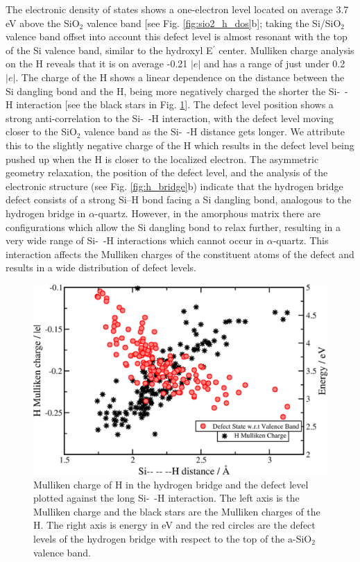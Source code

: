 \documentclass[aps,prb,reprint,superscriptaddress,showpacs]{revtex4-1}
\begin{document}
The electronic density of states shows a one-electron level located on average 3.7 eV above the SiO$_2$ valence band [see Fig. \ref{fig:sio2_h_dos}b]; taking the Si/SiO$_2$ valence band offset into account this defect level is almost resonant with the top of the Si valence band, similar to the hydroxyl E$^\prime$ center. Mulliken charge analysis on the H reveals that it is on average -0.21 $|e|$ and has a range of just under 0.2 $|e|$. The charge of the H shows a linear dependence on the distance between the Si dangling bond and the H, being more negatively charged the shorter the \mbox{Si- -H} interaction [see the black stars in Fig. \ref{fig:hbridge_correlation}]. The defect level position shows a strong anti-correlation to the \mbox{Si- -H} interaction, with the defect level moving closer to the SiO$_2$ valence band as the \mbox{Si- -H} distance gets longer. We attribute this to the slightly negative charge of the H which results in the defect level being pushed up when the H is closer to the localized electron. The asymmetric geometry relaxation, the position of the defect level, and the analysis of the electronic structure (see Fig. \ref{fig:h_bridge}b) indicate that the hydrogen bridge defect consists of a strong \mbox{Si--H} bond facing a Si dangling bond, analogous to the hydrogen bridge in $\alpha$-quartz. However, in the amorphous matrix there are configurations which allow the Si dangling bond to relax further, resulting in a very wide range of \mbox{Si- -H} interactions which cannot occur in $\alpha$-quartz. This interaction affects the Mulliken charges of the constituent atoms of the defect and results in a wide distribution of defect levels.

\begin{figure}[h!]
\includegraphics{hbridge_analysis.png}
\caption{Mulliken charge of H in the hydrogen bridge and the defect level plotted against the long \mbox{Si- -H} interaction. The left axis is the Mulliken charge and the black stars are the Mulliken charges of the H. The right axis is energy in eV and the red circles are the defect levels of the hydrogen bridge with respect to the top of the a-SiO$_2$ valence band.} 
\label{fig:hbridge_correlation}
\end{figure}
\end{document}
